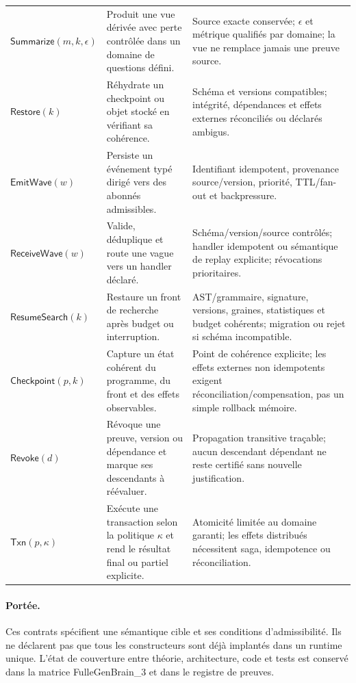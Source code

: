 \begin{longtable}{p{}p{}p{}}
\(\mathsf{Summarize}(m,k,\epsilon)\) & Produit une vue dérivée avec perte contrôlée dans un domaine de questions défini. & Source exacte conservée; \(\epsilon\) et métrique qualifiés par domaine; la vue ne remplace jamais une preuve source. \\
\(\mathsf{Restore}(k)\) & Réhydrate un checkpoint ou objet stocké en vérifiant sa cohérence. & Schéma et versions compatibles; intégrité, dépendances et effets externes réconciliés ou déclarés ambigus. \\
\(\mathsf{EmitWave}(w)\) & Persiste un événement typé dirigé vers des abonnés admissibles. & Identifiant idempotent, provenance source/version, priorité, TTL/fan-out et backpressure. \\
\(\mathsf{ReceiveWave}(w)\) & Valide, déduplique et route une vague vers un handler déclaré. & Schéma/version/source contrôlés; handler idempotent ou sémantique de replay explicite; révocations prioritaires. \\
\(\mathsf{ResumeSearch}(k)\) & Restaure un front de recherche après budget ou interruption. & AST/grammaire, signature, versions, graines, statistiques et budget cohérents; migration ou rejet si schéma incompatible. \\
\(\mathsf{Checkpoint}(p,k)\) & Capture un état cohérent du programme, du front et des effets observables. & Point de cohérence explicite; les effets externes non idempotents exigent réconciliation/compensation, pas un simple rollback mémoire. \\
\(\mathsf{Revoke}(d)\) & Révoque une preuve, version ou dépendance et marque ses descendants à réévaluer. & Propagation transitive traçable; aucun descendant dépendant ne reste certifié sans nouvelle justification. \\
\(\mathsf{Txn}(p,\kappa)\) & Exécute une transaction selon la politique \(\kappa\) et rend le résultat final ou partiel explicite. & Atomicité limitée au domaine garanti; les effets distribués nécessitent saga, idempotence ou réconciliation. \\
\bottomrule
\end{longtable}
\paragraph{Portée.} Ces contrats spécifient une sémantique cible et ses conditions d'admissibilité. Ils ne déclarent pas que tous les constructeurs sont déjà implantés dans un runtime unique. L'état de couverture entre théorie, architecture, code et tests est conservé dans la matrice FulleGenBrain\_3 et dans le registre de preuves.
